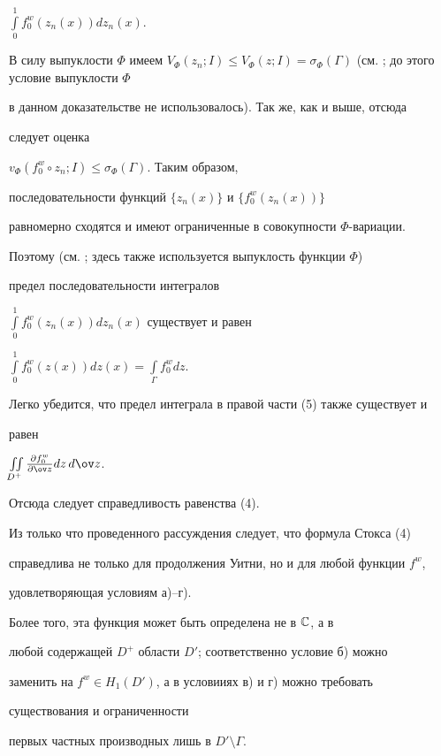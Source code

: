 $\int\limits_{0}^{1}{f^{w}_{0}(z_{n}(x))dz_{n}(x)}$.


В силу выпуклости $\Phi$ имеем $V_{\Phi}(z_{n};I)\le V_{\Phi}(z;I) =


\sigma_{\Phi}(\Gamma)$ (см. \cite{LO}; до этого условие выпуклости $\Phi$


в данном доказательстве не использовалось). Так же, как и выше, отсюда


следует оценка


$v_{\Phi}(f^{w}_{0}\circ z_n; I)\le \sigma_{\Phi}(\Gamma)$. Таким образом,


последовательности функций $\{z_{n}(x)\}$ и $\{f^{w}_{0}(z_{n}(x))\}$


равномерно сходятся и имеют ограниченные в совокупности $\Phi$-вариации.


Поэтому (см. \cite{LO}; здесь также используется выпуклость функции $\Phi$)


предел последовательности интегралов


$\int\limits_{0}^{1}{f^{w}_{0}(z_{n}(x))dz_{n}(x)}$ существует и равен


$\int\limits_{0}^{1}{f^{w}_{0}(z(x))dz(x)}=\int\limits_{\Gamma}{f^w_0 dz}$.


Легко убедится, что предел интеграла в правой части (5) также существует и


равен


$\iint\limits_{D^+}{\frac{\partial f^w_0}{\partial\ov z}dz\,d\ov z}$.


Отсюда следует справедливость равенства (4).





Из только что проведенного рассуждения следует, что формула Стокса (4)


справедлива не только для продолжения Уитни, но и для любой функции $f^w$,


удовлетворяющая условиям а)--г).


Более того, эта функция может быть определена не в ${\Bbb C}$, а в


любой содержащей $D^+$ области $D'$; соответственно условие б) можно


заменить на $f^{w}\in H_{1}(D')$, а в условииях в) и г) можно требовать


существования и ограниченности


первых частных производных лишь в $D'\setminus\Gamma$.





